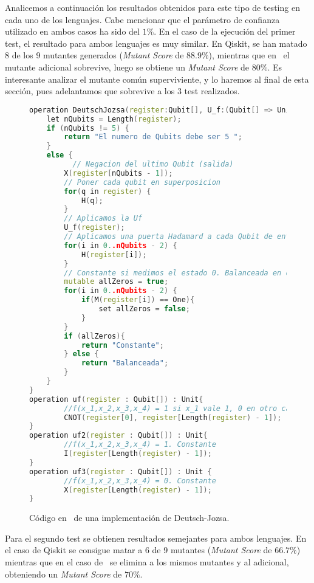 Analicemos a continuación los resultados obtenidos para este tipo de testing en cada uno de los lenguajes. Cabe mencionar que el parámetro de confianza utilizado en ambos casos ha sido del $1\%$.
%
En el caso de la ejecución del primer test, el resultado para ambos lenguajes es muy similar. En Qiskit, se han matado 8 de los 9 mutantes generados (\textit{Mutant Score} de $88.9\%$), mientras que en \qsh\ el mutante adicional sobrevive, luego se obtiene un \textit{Mutant Score} de $80\%$. Es interesante analizar el mutante común superviviente, y lo haremos al final de esta sección, pues adelantamos que sobrevive a los 3 test realizados.

\begin{figure}[t]
\begin{lstlisting}[language=c++]
operation DeutschJozsa(register:Qubit[], U_f:(Qubit[] => Unit)):String {
	let nQubits = Length(register);
    if (nQubits != 5) {
   		return "El numero de Qubits debe ser 5 ";
    }
    else {
    	  // Negacion del ultimo Qubit (salida)
        X(register[nQubits - 1]); 
        // Poner cada qubit en superposicion
        for(q in register) {
        	H(q);
        }         
        // Aplicamos la Uf
        U_f(register);
        // Aplicamos una puerta Hadamard a cada Qubit de entrada
        for(i in 0..nQubits - 2) {
        	H(register[i]);
        }        
        // Constante si medimos el estado 0. Balanceada en otro caso.
        mutable allZeros = true;
        for(i in 0..nQubits - 2) {
           	if(M(register[i]) == One){
            	set allZeros = false;
            }
        } 
        if (allZeros){
        	return "Constante";
        } else {
        	return "Balanceada";
        }
	}
}
operation uf(register : Qubit[]) : Unit{
		//f(x_1,x_2,x_3,x_4) = 1 si x_1 vale 1, 0 en otro caso. Balanceada
		CNOT(register[0], register[Length(register) - 1]);
}
operation uf2(register : Qubit[]) : Unit{
		//f(x_1,x_2,x_3,x_4) = 1. Constante
		I(register[Length(register) - 1]);
}
operation uf3(register : Qubit[]) : Unit { 
		//f(x_1,x_2,x_3,x_4) = 0. Constante  
		X(register[Length(register) - 1]);
}
\end{lstlisting}
\caption{Código en \qsh\ de una implementación de Deutsch-Jozsa.}
\label{fig:code63}
\end{figure}

Para el segundo test  se obtienen resultados semejantes para ambos lenguajes. En el caso de Qiskit se consigue matar a $6$ de $9$ mutantes (\textit{Mutant Score} de $66.7\%$) mientras que en el caso de \qsh\ se elimina a los mismos mutantes y al adicional, obteniendo un \textit{Mutant Score} de $70\%$. 

